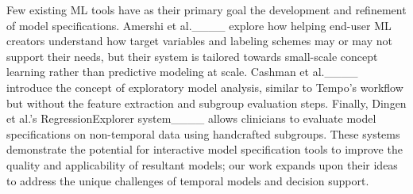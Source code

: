 Few existing ML tools have as their primary goal the development and refinement of model specifications. Amershi et al.____ explore how helping end-user ML creators understand how target variables and labeling schemes may or may not support their needs, but their system is tailored towards small-scale concept learning rather than predictive modeling at scale. Cashman et al.____ introduce the concept of exploratory model analysis, similar to Tempo's workflow but without the feature extraction and subgroup evaluation steps. Finally, Dingen et al.'s RegressionExplorer system____ allows clinicians to evaluate model specifications on non-temporal data using handcrafted subgroups. These systems demonstrate the potential for interactive model specification tools to improve the quality and applicability of resultant models; our work expands upon their ideas to address the unique challenges of temporal models and decision support.